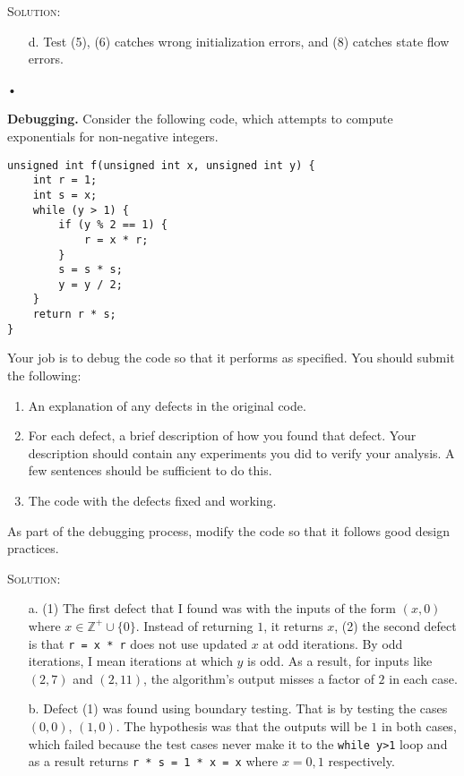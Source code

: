 \documentclass{exam}
\newenvironment{sol}{
  \medskip

  \textsc{Solution:}
}
{
  \medskip

}
\begin{document}
\begin{questions}
\begin{sol}
\begin{enumerate}
\item [d.] Test (5), (6) catches wrong initialization errors, and (8) catches state flow errors. 

\end{enumerate}•
\end{sol}


\question[12]
\textbf{Debugging.}
Consider the following code, which attempts to compute exponentials for non-negative integers. 
\begin{verbatim}
unsigned int f(unsigned int x, unsigned int y) {
    int r = 1;
    int s = x;
    while (y > 1) {
        if (y % 2 == 1) {
            r = x * r;
        }
        s = s * s;
        y = y / 2;
    }
    return r * s;
}
\end{verbatim}
Your job is to debug the code so that it performs as specified. 
You should submit the following:
\begin{enumerate}
\item An explanation of any defects in the original code. 

\item For each defect, a brief description of how you found that defect. 
Your description should contain any experiments you did to verify your analysis. 
A few sentences should be sufficient to do this. 
\item The code with the defects fixed and working. 
\end{enumerate}
As part of the debugging process, modify the code so that it follows good design practices. 

 \begin{sol}
 \color{blue}
\begin{enumerate}
\item[a.] (1) The first defect that I found was with the inputs of the form $(x,0)$ where $x \in \mathbb{Z}^+ \cup \{0\}$. Instead of returning $1$, it returns $x$, (2) the second defect is that \texttt{r = x * r} does not use updated $x$ at odd iterations. By odd iterations, I mean iterations at which $y$ is odd. As a result, for inputs like $(2,7)$ and $(2,11)$, the algorithm's output misses a factor of $2$ in each case.

\item[b.] Defect (1) was found using boundary testing. That is by testing the cases $(0,0)$, $(1,0)$. The hypothesis was that the outputs will be $1$ in both cases, which failed because the test cases never make it to the \texttt{while {y>1}} loop and as a result returns \texttt{r * s = 1 * x = x} where $x = 0,1$ respectively.



\end{enumerate}
\end{sol}
\end{questions}
\end{document}
